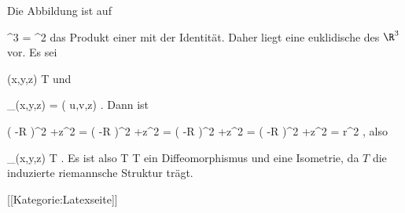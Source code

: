 Die Abbildung ist auf

\mavergleichskettedisp
{\vergleichskette
{ \R^3
}
{ =} { \R^2 \times \R
}
{ } {
}
{ } {
}
{ } {
}
}
{}{}{}
das Produkt einer
mit der Identität. Daher liegt eine euklidische
des $\R^3$ vor. Es sei

\mavergleichskette
{\vergleichskette
{ (x,y,z)
}
{ \in }{  T
}
{  }{
}
{    }{
}
{   }{
}
}
{}{}{}
und

\mavergleichskettedisp
{\vergleichskette
{ \Psi_\alpha(x,y,z)
}
{ =} { ( u,v,z)
}
{ } {
}
{ } {
}
{ } {
}
}
{}{}{.}
Dann ist

\mavergleichskettealigndrucklinks
{\vergleichskettealigndrucklinks
{ \left(   -R  \right)^2 +z^2
}
{ =} { \left(   -R  \right)^2 +z^2
}
{ =} { \left(   -R  \right)^2 +z^2
}
{ =} { \left(   -R  \right)^2 +z^2
}
{ =} { r^2
}
}
{}{}{,}
also

\mavergleichskette
{\vergleichskette
{ \Psi_\alpha(x,y,z)
}
{ \in }{  T
}
{  }{
}
{    }{
}
{   }{
}
}
{}{}{.}
Es ist also
\maabbdisp {\Psi_\alpha} { T} {T
} {}
ein Diffeomorphismus und eine Isometrie, da $T$ die induzierte riemannsche Struktur trägt.

 [[Kategorie:Latexseite]]
